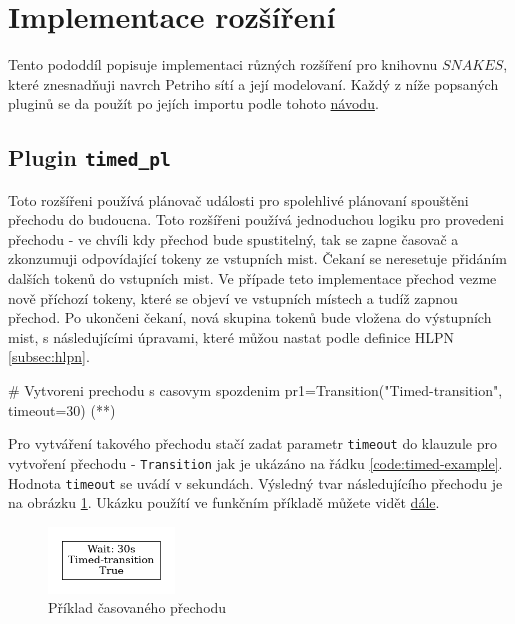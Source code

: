 
\section{Implementace rozšíření}
\label{sec:plug-impl}
Tento pododdíl popisuje implementaci různých rozšíření pro knihovnu $SNAKES$, které znesnadňuji navrch Petriho sítí a její modelovaní. Každý z níže popsaných pluginů se da  použít po jejích importu podle tohoto \href{https://www.ibisc.univ-evry.fr/~fpommereau/SNAKES/first-steps-with-snakes.html}{návodu}.

\subsection{Plugin \texttt{timed\_pl}}
\label{subsec:timed_pl}
Toto rozšířeni používá plánovač události pro spolehlivé plánovaní spouštěni přechodu do budoucna. Toto rozšířeni používá jednoduchou logiku pro provedeni přechodu - ve chvíli kdy přechod bude spustitelný, tak se zapne časovač a zkonzumuji odpovídající tokeny ze vstupních mist. Čekaní se neresetuje přidáním dalších tokenů do vstupních mist. Ve případe teto implementace přechod vezme nově příchozí tokeny, které se objeví ve vstupních místech a tudíž zapnou přechod. Po ukončeni čekaní, nová skupina tokenů bude vložena do výstupních mist, s následujícími úpravami, které můžou nastat podle definice HLPN \ref{subsec:hlpn}.


\begin{python}
  # Vytvoreni prechodu s casovym spozdenim
  pr1=Transition("Timed-transition", timeout=30) (*\label{code:timed-example}*)
\end{python}

Pro vytváření takového přechodu stačí zadat parametr \texttt{timeout} do klauzule pro vytvoření přechodu - \texttt{Transition} jak je ukázáno na řádku \ref{code:timed-example}. Hodnota \texttt{timeout} se uvádí v sekundách. Výsledný tvar následujícího přechodu je na obrázku \ref{timed-transition}. Ukázku použítí ve funkčním příkladě můžete vidět \hyperref[code:timed-temp-example]{dále}.

\begin{figure}[hbt]
  \centering
  \includegraphics[width=0.3\textwidth]{obrazky-figures/timed-transition.png}
  \caption{Příklad časovaného přechodu}
  \label{timed-transition}
\end{figure}

